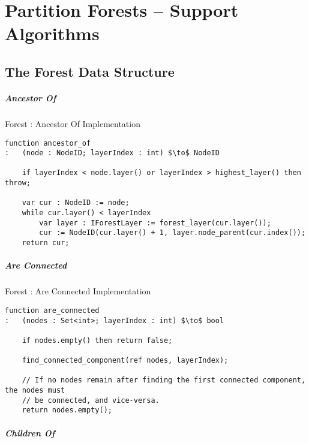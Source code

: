 \chapter{Partition Forests -- Support Algorithms}

\section{The Forest Data Structure}

\paragraph{Ancestor Of}

\begin{stulisting}[H]
\caption{Forest : Ancestor Of Implementation}
\begin{lstlisting}[style=Default]
function ancestor_of
:	(node : NodeID; layerIndex : int) $\to$ NodeID

	if layerIndex < node.layer() or layerIndex > highest_layer() then throw;

	var cur : NodeID := node;
	while cur.layer() < layerIndex
		var layer : IForestLayer := forest_layer(cur.layer());
		cur := NodeID(cur.layer() + 1, layer.node_parent(cur.index());
	return cur;
\end{lstlisting}
\end{stulisting}

\paragraph{Are Connected}

\begin{stulisting}[H]
\caption{Forest : Are Connected Implementation}
\begin{lstlisting}[style=Default]
function are_connected
:	(nodes : Set<int>; layerIndex : int) $\to$ bool

	if nodes.empty() then return false;

	find_connected_component(ref nodes, layerIndex);

	// If no nodes remain after finding the first connected component, the nodes must
	// be connected, and vice-versa.
	return nodes.empty();
\end{lstlisting}
\end{stulisting}

\paragraph{Children Of}

